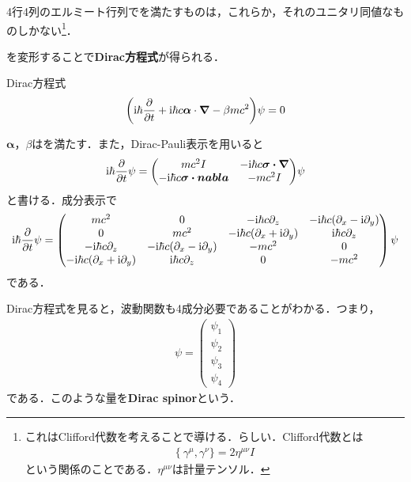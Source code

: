 \documentclass{report}
\begin{document}
4行4列のエルミート行列でを満たすものは，これらか，それのユニタリ同値なものしかない\footnote{
  これはClifford代数を考えることで導ける．らしい．Clifford代数とは
\begin{align}
  \{\ \gamma^\mu, \gamma^\nu\} = 2\eta^{\mu\nu} I
\end{align}
という関係のことである．$\eta^{\mu\nu}$は計量テンソル．
}．

を変形することで\textbf{Dirac方程式}が得られる．
\begin{itembox}[l]{Dirac方程式}
\begin{align}
  \qty(\mathrm{i}\hbar \frac{\partial}{\partial t} + \mathrm{i} \hbar c \bm{\alpha}\cdot \grad - \beta mc^2)\psi = 0
\end{align}
\end{itembox}
$\bm{\alpha}$，$\beta$はを満たす．また，Dirac-Pauli表示を用いると
\begin{align}
  \i\hbar \pdv{t}\psi = 
  \mqty(mc^2 I & -\i\hbar c\bm{\sigma\cdot\bm{\nabla} } \\ 
    -\i\hbar c\bm{\sigma\cdot\bm{nabla} } & -mc^2 I
    )\psi
\end{align}
と書ける．成分表示で
\begin{align}
  \label{dirac-eq-matrix}
  \mathrm{i}\hbar\frac{\partial}{\partial t}\psi =
  \begin{pmatrix}
    mc^2 & 0 & -\mathrm{i}\hbar c\partial_z & -\mathrm{i}\hbar c(\partial_x -\mathrm{i} \partial_y)\\
    0 & mc^2 & -\mathrm{i}\hbar c(\partial_x +\mathrm{i} \partial_y) & \mathrm{i}\hbar c\partial_z \\
    -\mathrm{i}\hbar c\partial_z & -\mathrm{i}\hbar c(\partial_x -\mathrm{i} \partial_y) & -mc^2 & 0\\
    -\mathrm{i}\hbar c(\partial_x +\mathrm{i} \partial_y) & \mathrm{i}\hbar c\partial_z & 0 & -mc^2
  \end{pmatrix}
  \psi
\end{align}
である．

Dirac方程式を見ると，波動関数も4成分必要であることがわかる．つまり，
\begin{align}
  \psi = 
  \begin{pmatrix}
    \psi_1\\\psi_2\\\psi_3\\\psi_4
  \end{pmatrix}
\end{align}
である．このような量を\textbf{Dirac spinor}という．
\end{document}
